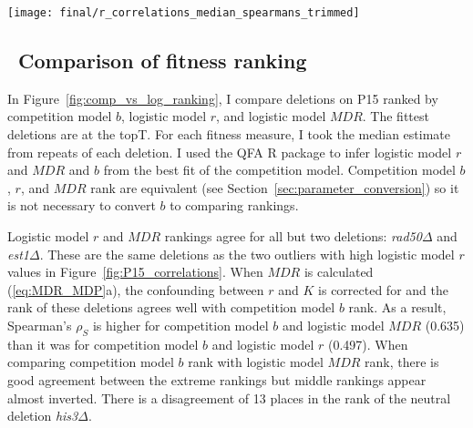 \graphicspath{{images/p15_correlations/}}
\begin{Figure}
  \centering
  \texttt{[image: final/r\_correlations\_median\_spearmans\_trimmed]}
  \label{fig:P15_correlations}
\end{Figure}

\subsection{\thesubsection~Comparison of fitness ranking}


In Figure~\ref{fig:comp_vs_log_ranking}, I compare deletions on P15
ranked by competition model \(b\), logistic model \(r\), and logistic
model \(MDR\). The fittest deletions are at the topT. For each fitness
measure, I took the median estimate from repeats of each deletion. I
used the QFA R package to infer logistic model \(r\) and \(MDR\) and
\(b\) from the best fit of the competition model. Competition model
\(b\), \(r\), and \(MDR\) rank are equivalent (see
Section~\ref{sec:parameter_conversion}) so it is not necessary to
convert \(b\) to comparing rankings.

Logistic model \(r\) and \(MDR\) rankings agree for all but two
deletions: \textit{rad50\(\Delta\)} and \textit{est1\(\Delta\)}. These
are the same deletions as the two outliers with high logistic model
\(r\) values in Figure~\ref{fig:P15_correlations}. When \(MDR\) is
calculated (\ref{eq:MDR_MDP}a), the confounding between \(r\) and
\(K\) is corrected for and the rank of these deletions agrees well
with competition model \(b\) rank. As a result, Spearman's
\(\rho_{S}\) is higher for competition model \(b\) and logistic model
\(MDR\) (0.635) than it was for competition model \(b\) and logistic
model \(r\) (0.497). When comparing competition model \(b\) rank with
logistic model \(MDR\) rank, there is good agreement between the
extreme rankings but middle rankings appear almost inverted. There is
a disagreement of 13 places in the rank of the neutral deletion
\textit{his3\(\Delta\)}.

